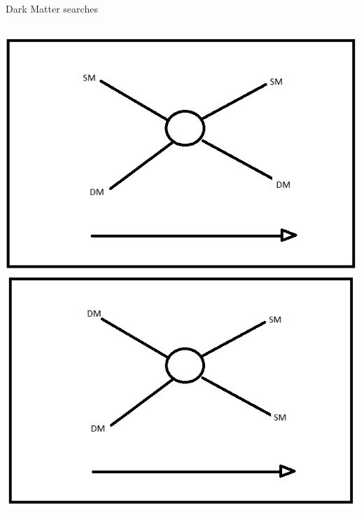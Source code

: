 \documentclass[11pt]{beamer}
\begin{document}
\begin{frame}[t]{Dark Matter searches}
\begin{small}
\begin{columns}
\begin{column}{0.4\textwidth}
\includegraphics[scale=0.14]{Direct_detection1.png}\\

\includegraphics[scale=0.14]{indirect_detection1.png}\\

\end{column}



\end{columns}

\end{small}
\end{frame}
\end{document}
